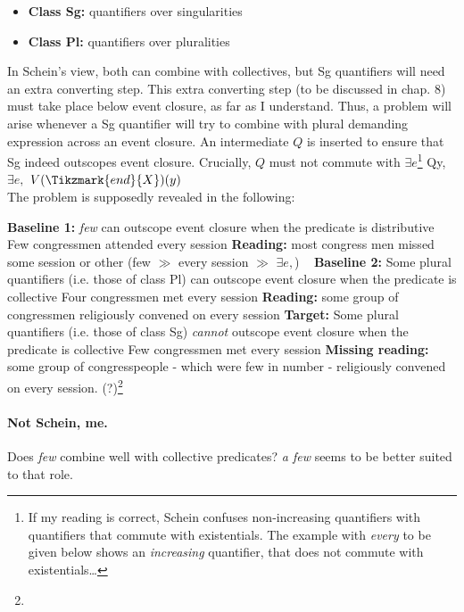 \documentclass[english]{article}
\begin{document}
\begin{itemize}
\item \textbf{Class Sg:} quantifiers over singularities 
\item \textbf{Class Pl:} quantifiers over pluralities
\end{itemize}
%
In Schein's view, both can combine with collectives, but Sg quantifiers will need an extra converting step. This extra converting step (to be discussed in chap. 8) must take place below event closure, as far as I understand. Thus, a problem will arise whenever a Sg quantifier will try to combine with plural demanding expression across an event closure. An intermediate $Q$ is inserted to ensure that Sg indeed outscopes event closure. Crucially, $Q$ must not commute with $\exists e$\footnote{If my reading is correct, Schein confuses non-increasing quantifiers with quantifiers that commute with existentials. The example with \emph{every} to be given below shows an \emph{increasing} quantifier, that does not commute with existentials\ldots}
\ex
{}\hspace{1.5ex} Qy,\hspace{1.5ex} $\exists e,$\hspace{1.5ex} $V(\Tikzmark{end}{X})(y)$\\
\xe
%
The problem is supposedly revealed in the following:

\pex \textbf{Baseline 1:} \emph{few} can outscope event closure when the predicate is distributive
\a Few congressmen attended every session
\a \textbf{Reading:} most congress men missed some session or other (few $\gg$ every session $\gg$ $\exists e,$)
\xe
%
\pex~ \textbf{Baseline 2:} Some plural quantifiers (i.e. those of class Pl) can outscope event closure when the predicate is collective
\a Four congressmen met every session
\a \textbf{Reading:} some group of congressmen religiously convened on every session
\xe
%
\pex \textbf{Target:} Some plural quantifiers (i.e. those of class Sg) \emph{cannot} outscope event closure when the predicate is collective
\a Few congressmen met every session
\a \textbf{Missing reading:} some group of congresspeople - which were few in number - religiously convened on every session. (?)\footnote{}
\xe
%
\paragraph{Not Schein, me.} Does \emph{few} combine well with collective predicates? \emph{a few} seems to be better suited to that role.
\end{document}
